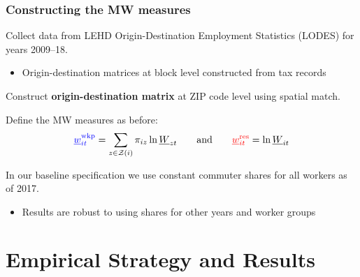 \documentclass[aspectratio=169, t]{beamer}
\newcommand{\Z}{\mathcal{Z}}
\newcommand{\MW}{\underline{W}}
\newcommand{\mw}{\underline{w}}
\newcommand{\wkp}{\text{wkp}}
\newcommand{\res}{\text{res}}
\begin{document}
\begin{frame}
    \frametitle{Constructing the MW measures}
        
    Collect data from LEHD Origin-Destination Employment Statistics (LODES) for years 2009--18.
    \begin{itemize}
        \item Origin-destination matrices at block level constructed from tax records
    \end{itemize}

    \vspace{1mm}
    Construct \textbf{origin-destination matrix} at ZIP code level using spatial match.
    
    \pause
    \vspace{2mm}
    Define the MW measures as before:
    $$
    {\color{blue} \mw^{\wkp}_{it}} = \sum_{z \in \Z(i)} \pi_{i z} \ln \MW_{zt}
    \quad\quad\text{and}\quad\quad
    {\color{red} \mw^{\res}_{it}} = \ln \MW_{it}
    $$

    \pause
    \vspace{2mm}
    In our baseline specification we use constant commuter shares for all workers as of 2017.
    \begin{itemize} \small
        \item Results are robust to using shares for other years and worker groups
    \end{itemize}

\end{frame}

\section{Empirical Strategy and Results}
\end{document}
